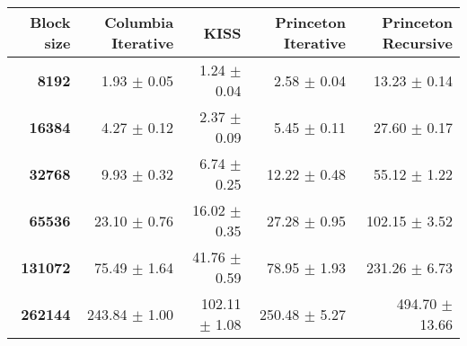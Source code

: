\begin{tabular}{rrrrr}\toprule
\textbf{Block size}  & \textbf{Columbia Iterative} & \textbf{KISS} & \textbf{Princeton Iterative} & \textbf{Princeton Recursive}\\\midrule
\textbf{8192}  & 1.93 $\pm$ 0.05 & 1.24 $\pm$ 0.04 & 2.58 $\pm$ 0.04 & 13.23 $\pm$ 0.14\\
\textbf{16384}  & 4.27 $\pm$ 0.12 & 2.37 $\pm$ 0.09 & 5.45 $\pm$ 0.11 & 27.60 $\pm$ 0.17\\
\textbf{32768}  & 9.93 $\pm$ 0.32 & 6.74 $\pm$ 0.25 & 12.22 $\pm$ 0.48 & 55.12 $\pm$ 1.22\\
\textbf{65536}  & 23.10 $\pm$ 0.76 & 16.02 $\pm$ 0.35 & 27.28 $\pm$ 0.95 & 102.15 $\pm$ 3.52\\
\textbf{131072}  & 75.49 $\pm$ 1.64 & 41.76 $\pm$ 0.59 & 78.95 $\pm$ 1.93 & 231.26 $\pm$ 6.73\\
\textbf{262144} & 243.84 $\pm$ 1.00 & 102.11 $\pm$ 1.08 & 250.48 $\pm$ 5.27 & 494.70 $\pm$ 13.66\\
\bottomrule
\end{tabular}
